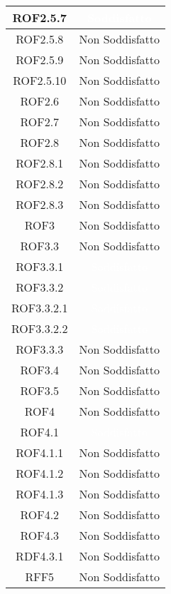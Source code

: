\begin{center}
\begin{longtable}[c]{|c|c|}
\hline
ROF2.5.7 & \cellcolor{verde}\textcolor{white}{Soddisfatto}\\
\hline
ROF2.5.8 & \cellcolor{rosso}Non Soddisfatto\\
\hline
ROF2.5.9 & \cellcolor{rosso}Non Soddisfatto\\
\hline
ROF2.5.10 & \cellcolor{rosso}Non Soddisfatto\\
\hline
ROF2.6 & \cellcolor{rosso}Non Soddisfatto\\
\hline
ROF2.7 & \cellcolor{rosso}Non Soddisfatto\\
\hline
ROF2.8 & \cellcolor{rosso}Non Soddisfatto\\
\hline
ROF2.8.1 & \cellcolor{rosso}Non Soddisfatto\\
\hline
ROF2.8.2 & \cellcolor{rosso}Non Soddisfatto\\
\hline
ROF2.8.3 & \cellcolor{rosso}Non Soddisfatto\\
\hline
ROF3 & \cellcolor{rosso}Non Soddisfatto\\
\hline
ROF3.3 & \cellcolor{rosso}Non Soddisfatto\\
\hline
ROF3.3.1 & \cellcolor{verde}\textcolor{white}{Soddisfatto}\\
\hline
ROF3.3.2 & \cellcolor{verde}\textcolor{white}{Soddisfatto}\\
\hline
ROF3.3.2.1 & \cellcolor{verde}\textcolor{white}{Soddisfatto}\\
\hline
ROF3.3.2.2 & \cellcolor{verde}\textcolor{white}{Soddisfatto}\\
\hline
ROF3.3.3 & \cellcolor{rosso}Non Soddisfatto\\
\hline
ROF3.4 & \cellcolor{rosso}Non Soddisfatto\\
\hline
ROF3.5 & \cellcolor{rosso}Non Soddisfatto\\
\hline
ROF4 & \cellcolor{rosso}Non Soddisfatto\\
\hline
ROF4.1 & \cellcolor{verde}\textcolor{white}{Soddisfatto}\\
\hline
ROF4.1.1 & \cellcolor{rosso}Non Soddisfatto\\
\hline
ROF4.1.2 & \cellcolor{rosso}Non Soddisfatto\\
\hline
ROF4.1.3 & \cellcolor{rosso}Non Soddisfatto\\
\hline
ROF4.2 & \cellcolor{rosso}Non Soddisfatto\\
\hline
ROF4.3 & \cellcolor{rosso}Non Soddisfatto\\
\hline
RDF4.3.1 & \cellcolor{rosso}Non Soddisfatto\\
\hline
RFF5 & \cellcolor{rosso}Non Soddisfatto\\

\end{longtable}
\end{center}
